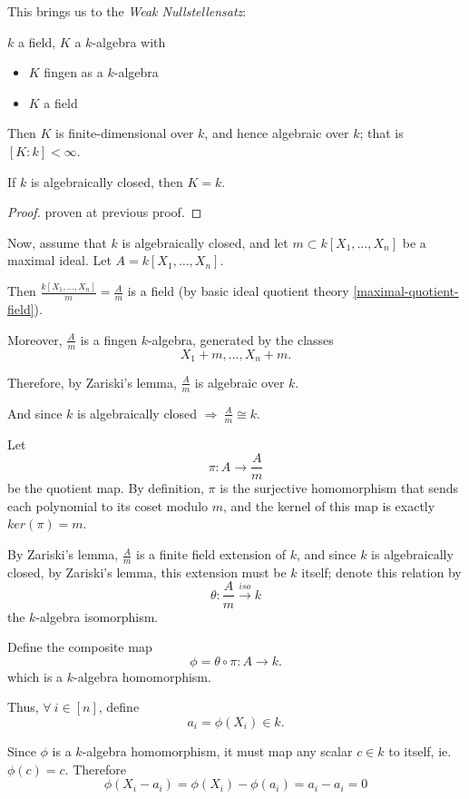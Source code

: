 \documentclass{article}
\theoremstyle{definition}
\newenvironment{thm}[1]
{\renewcommand\theinnerthm{#1}\innerthm}
{\endinnerthm}
\begin{document}
\vspace{0.5cm}
This brings us to the \emph{Weak Nullstellensatz}:

\begin{thm}{4.10}[Weak Nullstellensatz]\label{weak-nullstellensatz-again}
  $k$ a field, $K$ a $k$-algebra with
  \begin{itemize}
    \item $K$ fingen as a $k$-algebra
    \item $K$ a field
  \end{itemize}
  Then $K$ is finite-dimensional over $k$, and hence algebraic over $k$; that is $[K:k] < \infty$.

  If $k$ is algebraically closed, then $K=k$.
\end{thm}
\begin{proof}
  proven at previous proof.
\end{proof}



\vspace{0.8cm}
Now, assume that $k$ is algebraically closed, and let $m\subset k[X_1, \ldots, X_n]$ be a maximal ideal. Let $A=k[X_1, \ldots, X_n]$.

Then $\frac{k[X_1, \ldots, X_n]}{m} = \frac{A}{m}$ is a field (by basic ideal quotient theory \ref{maximal-quotient-field}).

Moreover, $\frac{A}{m}$ is a fingen $k$-algebra, generated by the classes
$$X_1+m,\ldots,X_n+m.$$

Therefore, by Zariski's lemma, $\frac{A}{m}$ is algebraic over $k$.

And since $k$ is algebraically closed $\Longrightarrow~ \frac{A}{m}\cong k$.

Let
$$\pi:A\longrightarrow \frac{A}{m}$$
be the quotient map. By definition, $\pi$ is the surjective homomorphism that sends each polynomial to its coset modulo $m$, and the kernel of this map is exactly $ker(\pi)=m$.

By Zariski's lemma, $\frac{A}{m}$ is a finite field extension of $k$, and since $k$ is algebraically closed, by Zariski's lemma, this extension must be $k$ itself; denote this relation by
$$\theta:\frac{A}{m}\stackrel{iso}{\longrightarrow} k$$
the $k$-algebra isomorphism.

Define the composite map
$$\phi=\theta\circ\pi:A\longrightarrow k.$$
which is a $k$-algebra homomorphism.

Thus, $\forall~ i\in[n]$, define
$$a_i=\phi(X_i)\in k.$$

Since $\phi$ is a $k$-algebra homomorphism, it must map any scalar $c \in k$ to itself, ie. $\phi(c) = c$. Therefore
$$\phi(X_i - a_i) = \phi(X_i) - \phi(a_i) = a_i - a_i = 0$$
\end{document}
